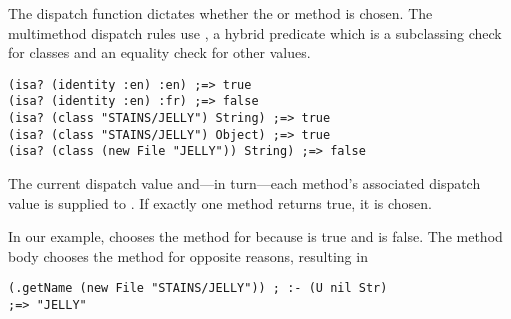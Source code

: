 \noindent
The dispatch function 
dictates 
whether the  or  method is chosen.
%
The multimethod dispatch rules use
, a hybrid predicate which is a subclassing check for classes and
an equality check for other values.

\begin{verbatim}
(isa? (identity :en) :en) ;=> true
(isa? (identity :en) :fr) ;=> false
(isa? (class "STAINS/JELLY") String) ;=> true
(isa? (class "STAINS/JELLY") Object) ;=> true
(isa? (class (new File "JELLY")) String) ;=> false
\end{verbatim}

The current dispatch value and---in turn---each method's associated dispatch value
is supplied to . If exactly one method returns true, it is chosen.

In our example,
chooses the  method for  because
is true and
is false. The  method body
chooses the  method for opposite reasons,
resulting in 
\begin{verbatim}
(.getName (new File "STAINS/JELLY")) ; :- (U nil Str)
;=> "JELLY"
\end{verbatim}

%
%
%

